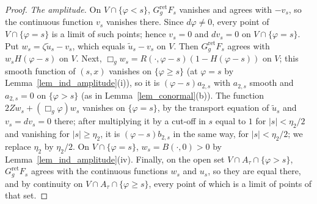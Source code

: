 \documentclass[11pt,a4paper,reqno]{amsart}
\theoremstyle{definition}
\numberwithin{equation}{section}
\newcommand{\ret}{\mathrm{ret}}
\begin{document}
\begin{proof}
\emph{The amplitude.} On $V\cap\{\varphi<s\}$, $G^\ret_gF_s$ vanishes and agrees with $-v_s$, so the continuous function
$v_s$ vanishes there. Since $d\varphi\ne0$, every point of $V\cap\{\varphi=s\}$ is a limit of such points; hence $v_s=0$
and $dv_s=0$ on $V\cap\{\varphi=s\}$. Put $w_s=\zeta\tilde u_s-v_s$, which equals $\tilde u_s-v_s$ on $V$. Then
$G^\ret_gF_s$ agrees with $w_sH(\varphi-s)$ on $V$. Next, $\Box_gw_s=R(\cdot,\varphi-s)(1-H(\varphi-s))$ on $V$; this
smooth function of $(s,x)$ vanishes on $\{\varphi\ge s\}$ (at $\varphi=s$ by Lemma~\ref{lem_ind_amplitude}(i)), so it is
$(\varphi-s)a_{2,s}$ with $a_{2,s}$ smooth and $a_{2,s}=0$ on $\{\varphi>s\}$ (as in Lemma~\ref{lem_conormal}(b)). The
function $2Zw_s+(\Box_g\varphi)w_s$ vanishes on $\{\varphi=s\}$, by the transport equation of $\tilde u_s$ and $v_s=dv_s=0$
there; after multiplying it by a cut-off in $s$ equal to $1$ for $|s|<\eta_2/2$ and vanishing for $|s|\ge\eta_2$, it is
$(\varphi-s)b_{2,s}$ in the same way, for $|s|<\eta_2/2$; we replace $\eta_2$ by $\eta_2/2$. On $V\cap\{\varphi=s\}$,
$w_s=B(\cdot,0)>0$ by Lemma~\ref{lem_ind_amplitude}(iv). Finally, on the open set $V\cap A_\tau\cap\{\varphi>s\}$,
$G^\ret_gF_s$ agrees with the continuous functions $w_s$ and $u_s$, so they are equal there, and by continuity on
$V\cap A_\tau\cap\{\varphi\ge s\}$, every point of which is a limit of points of that set.
\end{proof}
\end{document}
